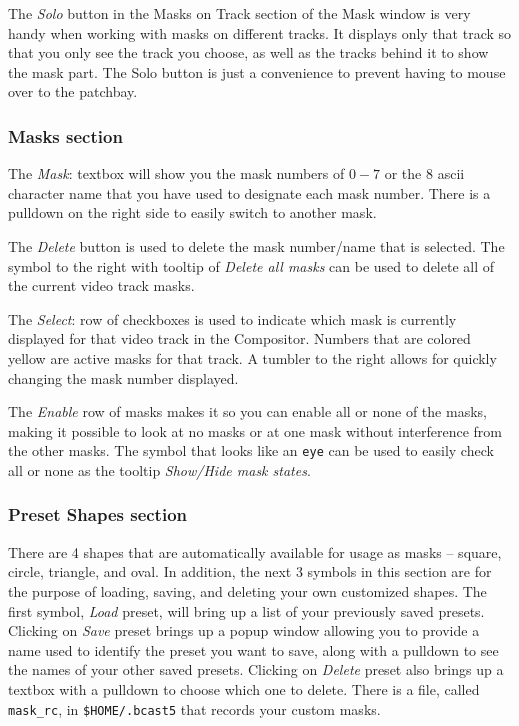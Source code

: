 The \textit{Solo} button in the Masks on Track section of the Mask window is very handy when working with masks on different tracks.  It displays only that track so that you only see the track you choose, as well as the tracks behind it to show the mask part.  The Solo button is just a convenience to prevent having to mouse over to the patchbay.

\subsubsection*{Masks section}%
\label{ssub:masks_section}

The \textit{Mask}: textbox will show you the mask numbers of $0-7$ or the 8 ascii character name that you have used to designate each mask number.  There is a pulldown on the right side to easily switch to another mask. 

The \textit{Delete} button is used to delete the mask number/name that is selected. The symbol to the right with tooltip of \textit{Delete all masks} can be used to delete all of the current video track masks.

The \textit{Select}: row of checkboxes is used to indicate which mask is currently displayed for that video track in the Compositor.  Numbers that are colored yellow are active masks for that track.  A tumbler to the right allows for quickly changing the mask number displayed.

The \textit{Enable} row of masks makes it so you can enable all or none of the masks, making it possible to look at no masks or at one mask without interference from the other masks. The symbol that looks like an \texttt{eye} can be used to easily check all or none as the tooltip \textit{Show/Hide mask states}.

\subsubsection*{Preset Shapes section}%
\label{ssub:preset_shape_section}

There are 4 shapes that are automatically available for usage as masks – square, circle, triangle, and oval.  In addition, the next 3 symbols in this section are for the purpose of loading, saving, and deleting your own customized shapes.  The first symbol, \textit{Load} preset, will bring up a list of your previously saved presets.  Clicking on \textit{Save} preset brings up a popup window allowing you to provide a name used to identify the preset you want to save, along with a pulldown to see the names of your other saved presets.   Clicking on \textit{Delete} preset also brings up a textbox with a pulldown to choose which one to delete.  There is a file, called \texttt{mask\_rc}, in \texttt{\$HOME/.bcast5} that records your custom masks.  


